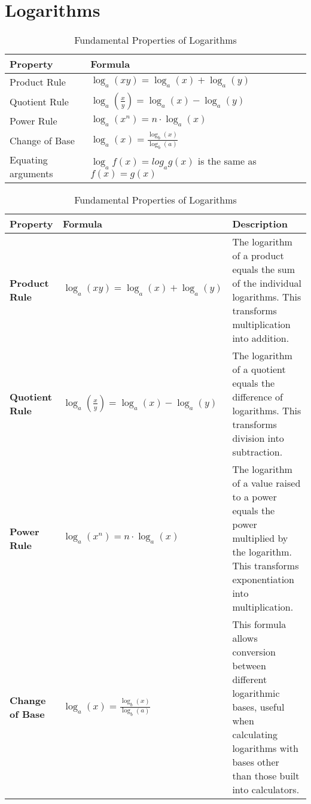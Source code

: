 \documentclass{article}
\begin{document}
\section{Logarithms}
\begin{table}[htbp]
\centering
\begin{tabular}{|l|l|}
\hline
\textbf{Property} & \textbf{Formula} \\
\hline
Product Rule & $\log_a(xy) = \log_a(x) + \log_a(y)$ \\
\hline
Quotient Rule & $\log_a\left(\frac{x}{y}\right) = \log_a(x) - \log_a(y)$ \\
\hline
Power Rule & $\log_a(x^n) = n \cdot \log_a(x)$ \\
\hline
Change of Base & $\log_a(x) = \frac{\log_b(x)}{\log_b(a)}$ \\
\hline
Equating arguments & $\log_af(x) = log_ag(x)$ is the same as $f(x) = g(x)$ \\
\hline
\end{tabular}
\caption{Fundamental Properties of Logarithms}
\label{tab:log_properties}
\end{table}

\begin{table}[htbp]
\centering
\renewcommand{\arraystretch}{1.5} %
\setlength{\tabcolsep}{15pt} %
\begin{tabular}{|l|p{5cm}|p{6cm}|}
\hline
\textbf{Property} & \textbf{Formula} & \textbf{Description} \\
\hline
\textbf{Product Rule} &
$\log_a(xy) = \log_a(x) + \log_a(y)$ &
The logarithm of a product equals the sum of the individual logarithms. This transforms multiplication into addition. \\
\hline
\textbf{Quotient Rule} &
$\log_a\left(\frac{x}{y}\right) = \log_a(x) - \log_a(y)$ &
The logarithm of a quotient equals the difference of logarithms. This transforms division into subtraction. \\
\hline
\textbf{Power Rule} &
$\log_a(x^n) = n \cdot \log_a(x)$ &
The logarithm of a value raised to a power equals the power multiplied by the logarithm. This transforms exponentiation into multiplication. \\
\hline
\textbf{Change of Base} &
$\log_a(x) = \frac{\log_b(x)}{\log_b(a)}$ &
This formula allows conversion between different logarithmic bases, useful when calculating logarithms with bases other than those built into calculators. \\
\hline
\end{tabular}
\caption{Fundamental Properties of Logarithms}
\label{tab:log_properties}
\end{table}
\end{document}

